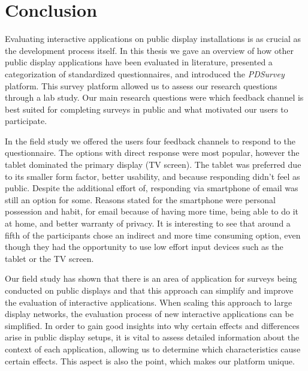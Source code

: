\section{Conclusion}
\label{chapter:conclusion}

	Evaluating interactive applications on public display installations is as crucial as the development process itself. In this thesis we gave an overview of how other public display applications have been evaluated in literature, presented a categorization of standardized questionnaires, and introduced the \textit{PDSurvey} platform. This survey platform allowed us to assess our research questions through a lab study. Our main research questions were which feedback channel is best suited for completing surveys in public and what motivated our users to participate. 

	In the field study we offered the users four feedback channels to respond to the questionnaire. The options with direct response were most popular, however the tablet dominated the primary display (TV screen). The tablet was preferred due to its smaller form factor, better usability, and because responding didn't feel as public. Despite the additional effort of, responding via smartphone of email was still an option for some. Reasons stated for the smartphone were personal possession and habit, for email because of having more time, being able to do it at home, and better warranty of privacy. It is interesting to see that around a fifth of the participants chose an indirect and more time consuming option, even though they had the opportunity to use low effort input devices such as the tablet or the TV screen.


	Our field study has shown that there is an area of application for surveys being conducted on public displays and that this approach can simplify and improve the evaluation of interactive applications. When scaling this approach to large display networks, the evaluation process of new interactive applications can be simplified. In order to gain good insights into why certain effects and differences arise in public display setups, it is vital to assess detailed information about the context of each application, allowing us to determine which characteristics cause certain effects. This aspect is also the point, which makes our platform unique. 

